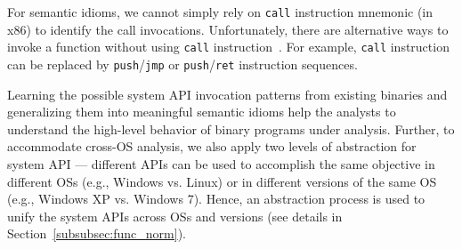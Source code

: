 For semantic idioms, we cannot simply rely on \texttt{call} instruction mnemonic (in x86) to identify the call invocations. Unfortunately, there are alternative ways to invoke a function without using \texttt{call} instruction~\cite{lakhotia2004abstracting}. For example, \texttt{call} instruction can be replaced by \texttt{push}/\texttt{jmp} or \texttt{push}/\texttt{ret} instruction sequences. %
%


Learning the possible system API invocation patterns from existing binaries and generalizing them into meaningful semantic idioms help the analysts to understand the high-level behavior of binary programs under analysis.  Further, to accommodate cross-OS analysis, we also apply two levels of abstraction for system API --- different APIs can be used to accomplish the same objective in different OSs (e.g., Windows vs. Linux) or in different versions of the same OS (e.g., Windows XP vs. Windows 7). Hence, an abstraction process is used to unify the system APIs across OSs and versions (see details in Section~\ref{subsubsec:func_norm}).




